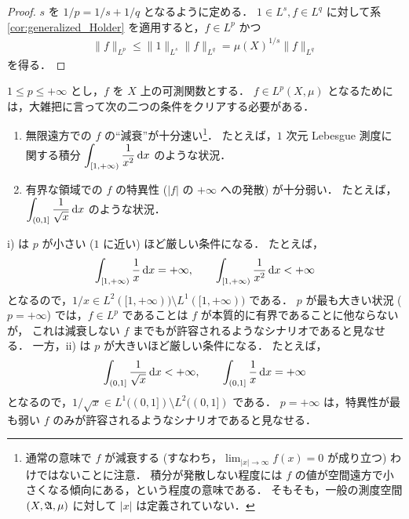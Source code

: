 \begin{proof}
    $s$ を $1/p=1/s+1/q$ となるように定める．
    $1\in L^s,f\in L^q$ に対して系 \ref{cor:generalized_Holder} を適用すると，$f\in L^p$ かつ
    \begin{align*}
        \|f\|_{L^p}
        \le\|1\|_{L^s}\|f\|_{L^q}
        =\mu(X)^{1/s}\|f\|_{L^q}
    \end{align*}
    を得る．
\end{proof}

\begin{remark}
    $1\le p\le+\infty$ とし，$f$ を $X$ 上の可測関数とする．
    $f\in L^p(X,\mu)$ となるためには，大雑把に言って次の二つの条件をクリアする必要がある．
    \begin{enumerate}
        \item
            無限遠方での $f$ の``減衰''が十分速い\footnote{
                通常の意味で $f$ が減衰する (すなわち，$\lim_{|x|\to\infty}f(x)=0$ が成り立つ) わけではないことに注意．
                積分が発散しない程度には $f$ の値が空間遠方で小さくなる傾向にある，という程度の意味である．
                そもそも，一般の測度空間 $(X,\mathfrak{A},\mu)$ に対して $|x|$ は定義されていない．
            }．
            たとえば，$1$ 次元 Lebesgue 測度に関する積分 $\displaystyle\int_{[1,+\infty)}\frac{1}{x^2}\,\mathrm{d} x$ のような状況．
        \item
            有界な領域での $f$ の特異性 ($|f|$ の $+\infty$ への発散) が十分弱い．
            たとえば，$\displaystyle\int_{(0,1]}\frac{1}{\sqrt x}\,\mathrm{d} x$ のような状況．
    \end{enumerate}
    \textrm{i)} は $p$ が小さい ($1$ に近い) ほど厳しい条件になる．
    たとえば，
    \begin{align*}
        \int_{[1,+\infty)}\frac{1}{x}\,\mathrm{d} x=+\infty,\qquad
        \int_{[1,+\infty)}\frac{1}{x^2}\,\mathrm{d} x<+\infty
    \end{align*}
    となるので，$1/x\in L^2([1,+\infty))\setminus L^1([1,+\infty))$ である．
    $p$ が最も大きい状況 ($p=+\infty$) では，$f\in L^p$ であることは $f$ が本質的に有界であることに他ならないが，
    これは減衰しない $f$ までもが許容されるようなシナリオであると見なせる．
    一方，\textrm{ii)} は $p$ が大きいほど厳しい条件になる．
    たとえば，
    \begin{align*}
        \int_{(0,1]}\frac{1}{\sqrt x}\,\mathrm{d} x<+\infty,\qquad
        \int_{(0,1]}\frac{1}{x}\,\mathrm{d} x=+\infty
    \end{align*}
    となるので，$1/\sqrt x\in L^1((0,1])\setminus L^2((0,1])$ である．
    $p=+\infty$ は，特異性が最も弱い $f$ のみが許容されるようなシナリオであると見なせる．


\end{remark}
